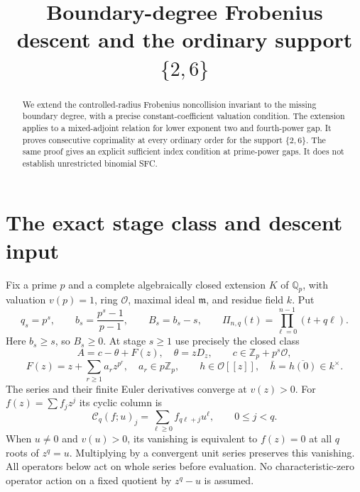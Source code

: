 \documentclass[11pt]{article}
\begin{document}
\setlength{\emergencystretch}{1em}
\title{Boundary-degree Frobenius descent and the ordinary support $\{2,6\}$}
\author{}\date{}\maketitle
\begin{abstract}
We extend the controlled-radius Frobenius noncollision invariant to
the missing boundary degree, with a precise constant-coefficient
valuation condition. The extension applies to a mixed-adjoint relation
for lower exponent two and fourth-power gap. It proves consecutive
coprimality at every ordinary order for the support $\{2,6\}$.
The same proof gives an explicit sufficient index condition at
prime-power gaps. It does not establish unrestricted binomial SFC.
\end{abstract}

\section{The exact stage class and descent input}
Fix a prime $p$ and a complete algebraically closed extension $K$ of
$\mathbb Q_p$, with valuation $v(p)=1$, ring $\mathcal O$, maximal
ideal $\mathfrak m$, and residue field $k$. Put
\[
 q_s=p^s,\qquad b_s=\frac{p^s-1}{p-1},\qquad
 B_s=b_s-s,\qquad
 \Pi_{n,q}(t)=\prod_{\ell=0}^{n-1}(t+q\ell).
\]
Here $b_s\ge s$, so $B_s\ge0$.
At stage $s\ge1$ use precisely the closed class
\[
 A=c-\theta+F(z),\quad\theta=zD_z,\qquad
 c\in\mathbb Z_p+p^s\mathcal O,
\]
\[
 F(z)=z+\sum_{r\ge1}a_rz^{p^r},\quad a_r\in p\mathbb Z_p,\qquad
 h\in\mathcal O[[z]],\quad
 \bar h=\overline{h(0)}\in k^\times.
\]
The series and their finite Euler derivatives converge at $v(z)>0$.
For $f(z)=\sum f_jz^j$ its cyclic column is
\[
 \mathcal C_q(f;u)_j=\sum_{\ell\ge0}f_{q\ell+j}u^\ell,
             \qquad0\le j<q.
\]
When $u\ne0$ and $v(u)>0$, its vanishing is equivalent to
$f(z)=0$ at all $q$ roots of $z^q=u$.
Multiplying by a convergent unit series preserves this vanishing.
All operators below act on whole series before evaluation.
No characteristic-zero operator action on a fixed quotient
by $z^q-u$ is assumed.
\end{document}
